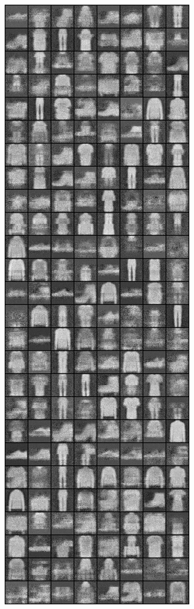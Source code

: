 \begin{figure}
\includegraphics[width=\picwidth\columnwidth]{figures/supplementary/alternative_fmnist/image_1000.png}\\

\end{figure}
